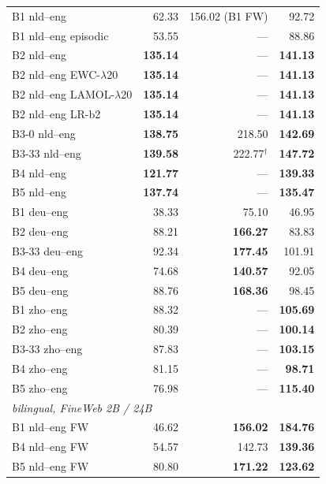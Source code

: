 \begin{table}[!ht]
\begin{tabular}{lrrr}
    \midrule
    B1 nld--eng           & 62.33 & 156.02 (B1 FW) & 92.72 \\
    B1 nld--eng episodic  & 53.55 & --- & 88.86 \\
    B2 nld--eng           & \textbf{135.14} & --- & \textbf{141.13} \\
    B2 nld--eng EWC-$\lambda$20 & \textbf{135.14} & --- & \textbf{141.13} \\
    B2 nld--eng LAMOL-$\lambda$20 & \textbf{135.14} & --- & \textbf{141.13} \\
    B2 nld--eng LR-b2     & \textbf{135.14} & --- & \textbf{141.13} \\
    B3-0 nld--eng         & \textbf{138.75} & 218.50 & \textbf{142.69} \\
    B3-33 nld--eng        & \textbf{139.58} & 222.77$^{\dagger}$ & \textbf{147.72} \\
    B4 nld--eng           & \textbf{121.77} & --- & \textbf{139.33} \\
    B5 nld--eng           & \textbf{137.74} & --- & \textbf{135.47} \\
    B1 deu--eng           & 38.33 & 75.10 & 46.95 \\
    B2 deu--eng           & 88.21 & \textbf{166.27} & 83.83 \\
    B3-33 deu--eng        & 92.34 & \textbf{177.45} & 101.91 \\
    B4 deu--eng           & 74.68 & \textbf{140.57} & 92.05 \\
    B5 deu--eng           & 88.76 & \textbf{168.36} & 98.45 \\
    B1 zho--eng           & 88.32 & --- & \textbf{105.69} \\
    B2 zho--eng           & 80.39 & --- & \textbf{100.14} \\
    B3-33 zho--eng        & 87.83 & --- & \textbf{103.15} \\
    B4 zho--eng           & 81.15 & --- & \textbf{98.71} \\
    B5 zho--eng           & 76.98 & --- & \textbf{115.40} \\
    \midrule
    \multicolumn{4}{l}{\textit{\beetle{} bilingual, FineWeb 2B / 24B}} \\
    \midrule
    B1 nld--eng FW        & 46.62 & \textbf{156.02} & \textbf{184.76} \\
    B4 nld--eng FW        & 54.57 & 142.73 & \textbf{139.36} \\
    B5 nld--eng FW        & 80.80 & \textbf{171.22} & \textbf{123.62} \\

\end{tabular}
\end{table}
